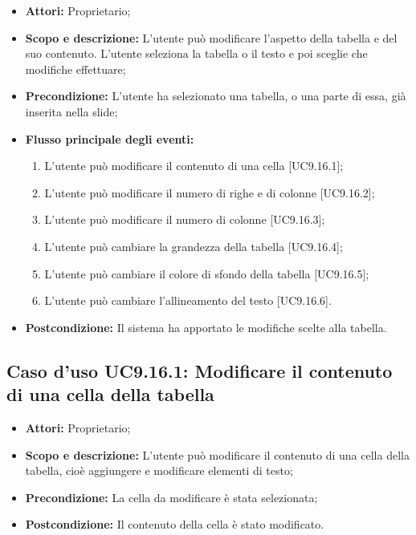 \begin{itemize}
	\item \textbf{Attori:} Proprietario;
	\item \textbf{Scopo e descrizione:} L'utente può modificare l'aspetto della tabella e del suo contenuto. L'utente seleziona la tabella o il testo e poi sceglie che modifiche effettuare;
	\item \textbf{Precondizione:} L'utente ha selezionato una tabella, o una parte di essa, già inserita nella \gls{slide};
	\item \textbf{Flusso principale degli eventi:}
	\begin{enumerate}
		\item L'utente può modificare il contenuto di una cella [UC9.16.1];
		\item L'utente può modificare il numero di righe e di colonne [UC9.16.2];
		\item L'utente può modificare il numero di colonne [UC9.16.3];
		\item L'utente può cambiare la grandezza della tabella [UC9.16.4];
		\item L'utente può cambiare il colore di sfondo della tabella [UC9.16.5];
		\item L'utente può cambiare l'allineamento del testo [UC9.16.6].
	\end{enumerate}
	\item \textbf{Postcondizione:} Il sistema ha apportato le modifiche scelte alla tabella.
\end{itemize}

	\subsection{Caso d'uso UC9.16.1: Modificare il contenuto di una cella della tabella}
	\begin{itemize}
		\item \textbf{Attori:} Proprietario;
		\item \textbf{Scopo e descrizione:} L'utente può modificare il contenuto di una cella della tabella, cioè aggiungere e modificare elementi di testo;
		\item \textbf{Precondizione:} La cella da modificare è stata selezionata;
		\item \textbf{Postcondizione:} Il contenuto della cella è stato modificato.
	\end{itemize}
	
